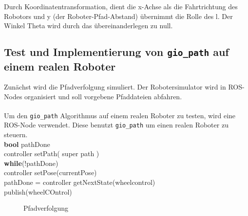 \documentclass[11pt,a4paper]{article}
\begin{document}
{Durch Koordinatentransformation, dient die x-Achse als die Fahrtrichtung des Robotors  und y (der Roboter-Pfad-Abstand) \"ubernimmt die Rolle des l. Der Winkel Theta wird durch das \"ubereinanderlegen zu null.




\subsection{Test und Implementierung von \texttt{gio\_path} auf einem realen Roboter}
Zun\"achst wird die Pfadverfolgung simuliert. Der Robotersimulator wird in ROS-Nodes organisiert und soll vorgebene Pfaddateien abfahren.
\\
\\
Um den \texttt{gio\_path} Algorithmus auf einem realen Roboter zu testen, wird eine ROS-Node verwendet. Diese benutzt  \texttt{gio\_path} um einen realen Roboter zu steuern.
\\

  \textbf{bool} pathDone\\
  controller setPath( super path ) \\
  \textbf{while}(!pathDone)                  \\
	  controller setPose(currentPose)\\
	  pathDone = controller getNextState(wheelcontrol) \\
	  publish(wheelCOntrol)
\\

\begin{figure}[h]
	\centering
	\caption{Pfadverfolgung}
\end{figure}

}
\end{document}
